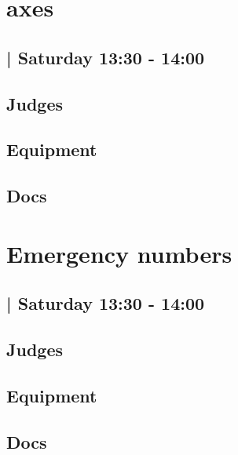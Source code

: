 \documentclass[10pt]{article}
\begin{document}
		\begin{minipage}{\linewidth}
		\setcounter{section}{38}
	\section{axes }
	\subsection*{ | Saturday 13:30 - 14:00}

	

	\begin{multicols}{2}
	\subsection*{\faUsers \: Judges}
	\begin{itemize}
		\end{itemize}
	\columnbreak
	\subsection*{\faWrench \: Equipment}
	        \vfill\null
        \subsection*{\faFile \: Docs}
     	\end{multicols}


	\vspace{1cm}
	\end{minipage}

		\begin{minipage}{\linewidth}
		\setcounter{section}{39}
	\section{Emergency numbers }
	\subsection*{ | Saturday 13:30 - 14:00}

	

	\begin{multicols}{2}
	\subsection*{\faUsers \: Judges}
	\begin{itemize}
		\end{itemize}
	\columnbreak
	\subsection*{\faWrench \: Equipment}
	        \vfill\null
        \subsection*{\faFile \: Docs}
     	\end{multicols}


	\vspace{1cm}
	\end{minipage}
\end{document}
